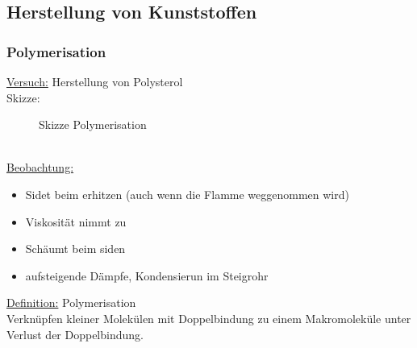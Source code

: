 \documentclass[../../main.tex]{subfiles}
\begin{document}
\subsection{Herstellung von Kunststoffen}
\subsubsection{Polymerisation}
\underline{Versuch:} Herstellung von Polysterol\\
Skizze:
\begin{figure}[h]
    \centering
    \caption{Skizze Polymerisation}
    \label{fig:skizze-polymerisation}
\end{figure}
\\
\underline{Beobachtung:}
\begin{itemize}
    \item Sidet beim erhitzen (auch wenn die Flamme weggenommen wird)
    \item Viskosität nimmt zu
    \item Schäumt beim siden
    \item aufsteigende Dämpfe, Kondensierun im Steigrohr
\end{itemize}
\underline{Definition:} Polymerisation \\
Verknüpfen kleiner Molekülen mit Doppelbindung zu einem Makromoleküle unter
Verlust der Doppelbindung.\\
%
\end{document}
